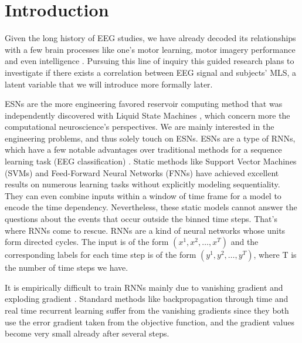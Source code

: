 \documentclass[a4paper,11pt,oneside]{article}
\begin{document}
\renewcommand{\nomname}{Abbreviations}
\printnomenclature[0.5in]
\clearpage

\section{Introduction}
Given the long history of EEG studies, we have already decoded its relationships with a few brain processes like one's motor learning, motor imagery performance and even intelligence \cite{zhang2015efficient} \cite{ozdenizci2016resting}\cite{Doppelmayr2002289}.  Pursuing this line of inquiry this guided research plans to investigate if there exists a correlation between EEG signal and subjects'  MLS, a latent variable that we will introduce more formally later.


ESNs \cite{jaeger2001echo} are the more engineering favored reservoir computing method that was
independently discovered with Liquid State Machines \cite{maass2002real}, which concern more the computational
neuroscience's perspectives. We are mainly interested in the engineering problems, and thus solely touch on ESNs.
ESNs are a type of RNNs, which have a few notable advantages over traditional methods
for a sequence learning task (EEG classification)  \cite{lipton2015critical}. Static methods like Support Vector 
Machines (SVMs) and  Feed-Forward Neural Networks (FNNs) 
   have 
achieved excellent results on numerous learning tasks without explicitly modeling sequentiality. They can even
combine inputs within a window of time frame for a model to encode the time dependency. Nevertheless, these static models cannot answer the questions about the events that occur outside the binned time steps. That's where RNNs come to rescue.
RNNs are a kind of neural networks whose units form directed cycles. The input is of the form $(x^1, x^2, \dots, x^T)$
and the corresponding labels for each time step is of the form $(y^1, y^2, \dots, y^T)$, where T is the number of time steps we have. 

It is empirically difficult to train RNNs mainly due to vanishing gradient and exploding gradient \cite{bengio1994learning}. Standard methods like backpropagation through time
and real time recurrent learning suffer from the vanishing gradients since they both  use the error gradient
taken from the objective function, and the gradient values become very small already after several steps.
\end{document}
